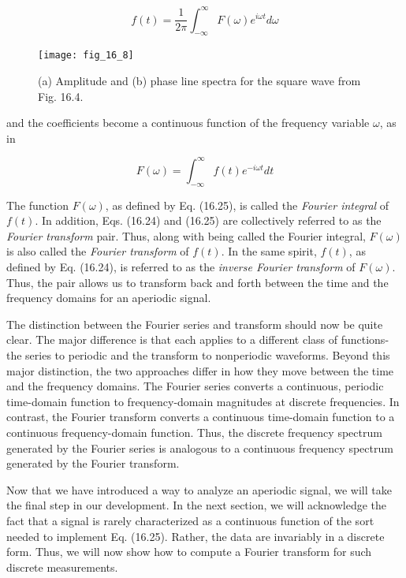\documentclass[../main.tex]{subfiles}
\begin{document}
\begin{equation}
	\tag{16.24}
	f(t) = \frac{1}{2 \pi} \int ^ \infty _ {-\infty} F(\omega) e ^ {i \omega t} d \omega
\end{equation}

\begin{figure}[H] 
	\centering
	\texttt{[image: fig\_16\_8]}
	\caption{\textsf{(a) Amplitude and (b) phase line spectra for the square wave from Fig. 16.4.}}
	\label{fig:fig_16_8}
\end{figure}

\noindent and the coefficients become a continuous function of the frequency variable $\omega$, as in

\begin{equation}
	\tag{16.25}
	F(\omega) = \int ^ \infty _ {-\infty} f(t)e ^ {-i \omega t} dt
\end{equation}

The function $F(\omega)$, as defined by Eq. (16.25), is called the \textit{Fourier integral} of $f(t)$. In
addition, Eqs. (16.24) and (16.25) are collectively referred to as the \textit{Fourier transform}
pair. Thus, along with being called the Fourier integral, $F(\omega)$ is also called the \textit{Fourier
transform} of $f(t)$. In the same spirit, $f(t)$, as defined by Eq. (16.24), is referred to as the
\textit{inverse Fourier transform} of $F(\omega)$. Thus, the pair allows us to transform back and forth
between the time and the frequency domains for an aperiodic signal.

The distinction between the Fourier series and transform should now be quite clear.
The major difference is that each applies to a different class of functions-the series to periodic and the transform to nonperiodic waveforms. Beyond this major distinction, the two
approaches differ in how they move between the time and the frequency domains. The
Fourier series converts a continuous, periodic time-domain function to frequency-domain
magnitudes at discrete frequencies. In contrast, the Fourier transform converts a continuous time-domain function to a continuous frequency-domain function. Thus, the discrete
frequency spectrum generated by the Fourier series is analogous to a continuous frequency
spectrum generated by the Fourier transform.

Now that we have introduced a way to analyze an aperiodic signal, we will take the
final step in our development. In the next section, we will acknowledge the fact that a
signal is rarely characterized as a continuous function of the sort needed to implement
Eq. (16.25). Rather, the data are invariably in a discrete form. Thus, we will now show how
to compute a Fourier transform for such discrete measurements.
\end{document}
